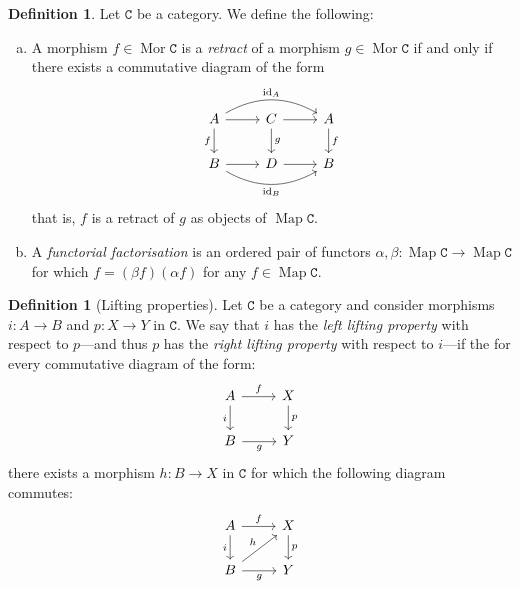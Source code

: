 \documentclass[11pt, reqno]{amsart}
\theoremstyle{definition}
\newtheorem{definition}[theorem]{Definition}
\newcommand{\cat}{\texttt}
\DeclareMathOperator{\Map}{Map}
\DeclareMathOperator{\Mor}{Mor}   %
\DeclareMathOperator{\Id}{id}     %
\begin{document}
\begin{definition}
\label{def:retracts-and-functorial-factorisations}
Let \(\cat C\) be a category. We define the following:
\begin{enumerate}[(a)]\setlength\itemsep{0em}
\item A morphism \(f \in \Mor \cat C\) is a \emph{retract} of a morphism
  \(g \in \Mor \cat C\) if and only if there exists a commutative diagram of the
  form
  \[
  \begin{tikzcd}
  A \ar[r] \ar[d, "f"'] \ar[rr, "\Id_A", bend left]
  &C \ar[r] \ar[d, "g"]
  &A \ar[d, "f"] \\
  B \ar[r] \ar[rr, "\Id_B"', bend right]
  &D \ar[r]
  &B
  \end{tikzcd}
  \]
  that is, \(f\) is a retract of \(g\) as objects of \(\Map \cat C\).

\item A \emph{functorial factorisation} is an ordered pair of
  functors \(\alpha, \beta: \Map \cat C \to \Map \cat C\) for which \(f = (\beta f)(\alpha f)\) for
  any \(f \in \Map \cat C\).
\end{enumerate}
\end{definition}

\begin{definition}[Lifting properties]
\label{def:lifting-properties}
Let \(\cat C\) be a category and consider morphisms \(i: A \to B\) and \(p: X \to
Y\) in \(\cat C\). We say that \(i\) has the \emph{left lifting property} with
respect to \(p\)---and thus \(p\) has the \emph{right lifting property} with
respect to \(i\)---if the for every commutative diagram of the form:
\[
\begin{tikzcd}
A \ar[r, "f"] \ar[d, "i"'] &X \ar[d, "p"] \\
B \ar[r, "g"'] &Y
\end{tikzcd}
\]
there exists a morphism \(h: B \to X\) in \(\cat C\) for which the following
diagram commutes:
\[
\begin{tikzcd}
A \ar[r, "f"] \ar[d, "i"'] &X \ar[d, "p"] \\
B \ar[r, "g"'] \ar[ru, "h"] &Y
\end{tikzcd}
\]
\end{definition}
\end{document}
